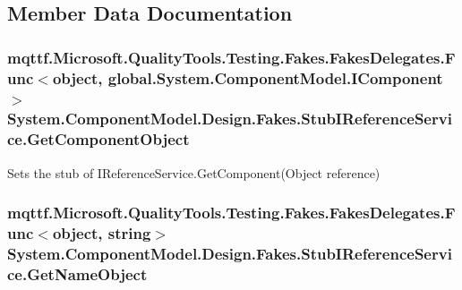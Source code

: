\subsection{Member Data Documentation}
\hypertarget{class_system_1_1_component_model_1_1_design_1_1_fakes_1_1_stub_i_reference_service_a63856a59deec8d19a340467b2be38812}{
\subsubsection[{Get\-Component\-Object}]{\setlength{\rightskip}{0pt plus 5cm}mqttf.\-Microsoft.\-Quality\-Tools.\-Testing.\-Fakes.\-Fakes\-Delegates.\-Func$<$object, global.\-System.\-Component\-Model.\-I\-Component$>$ System.\-Component\-Model.\-Design.\-Fakes.\-Stub\-I\-Reference\-Service.\-Get\-Component\-Object}}\label{class_system_1_1_component_model_1_1_design_1_1_fakes_1_1_stub_i_reference_service_a63856a59deec8d19a340467b2be38812}


Sets the stub of I\-Reference\-Service.\-Get\-Component(\-Object reference)

\hypertarget{class_system_1_1_component_model_1_1_design_1_1_fakes_1_1_stub_i_reference_service_a1f291b4f350da0d1f20a7791a44acfe2}{
\subsubsection[{Get\-Name\-Object}]{\setlength{\rightskip}{0pt plus 5cm}mqttf.\-Microsoft.\-Quality\-Tools.\-Testing.\-Fakes.\-Fakes\-Delegates.\-Func$<$object, string$>$ System.\-Component\-Model.\-Design.\-Fakes.\-Stub\-I\-Reference\-Service.\-Get\-Name\-Object}}\label{class_system_1_1_component_model_1_1_design_1_1_fakes_1_1_stub_i_reference_service_a1f291b4f350da0d1f20a7791a44acfe2}


